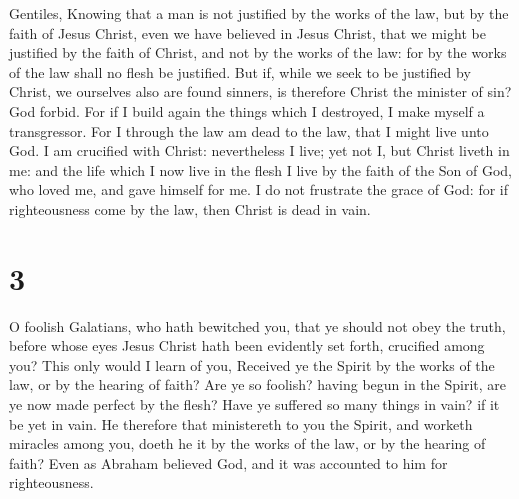 Gentiles,  Knowing that a man is not justified by the works
of the law, but by the faith of Jesus Christ, even we have believed in
Jesus Christ, that we might be justified by the faith of Christ, and not
by the works of the law: for by the works of the law shall no flesh be
justified.  But if, while we seek to be justified by
Christ, we ourselves also are found sinners, is therefore Christ the
minister of sin? God forbid.  For if I build again the
things which I destroyed, I make myself a transgressor. 
For I through the law am dead to the law, that I might live unto God.
 I am crucified with Christ: nevertheless I live; yet not
I, but Christ liveth in me: and the life which I now live in the flesh I
live by the faith of the Son of God, who loved me, and gave himself for
me.  I do not frustrate the grace of God: for if
righteousness come by the law, then Christ is dead in vain.

\hypertarget{section-2}{%
\section{3}\label{section-2}}

 O foolish Galatians, who hath bewitched you, that ye should
not obey the truth, before whose eyes Jesus Christ hath been evidently
set forth, crucified among you?  This only would I learn of
you, Received ye the Spirit by the works of the law, or by the hearing
of faith?  Are ye so foolish? having begun in the Spirit,
are ye now made perfect by the flesh?  Have ye suffered so
many things in vain? if it be yet in vain.  He therefore
that ministereth to you the Spirit, and worketh miracles among you,
doeth he it by the works of the law, or by the hearing of faith?
 Even as Abraham believed God, and it was accounted to him
for righteousness.

